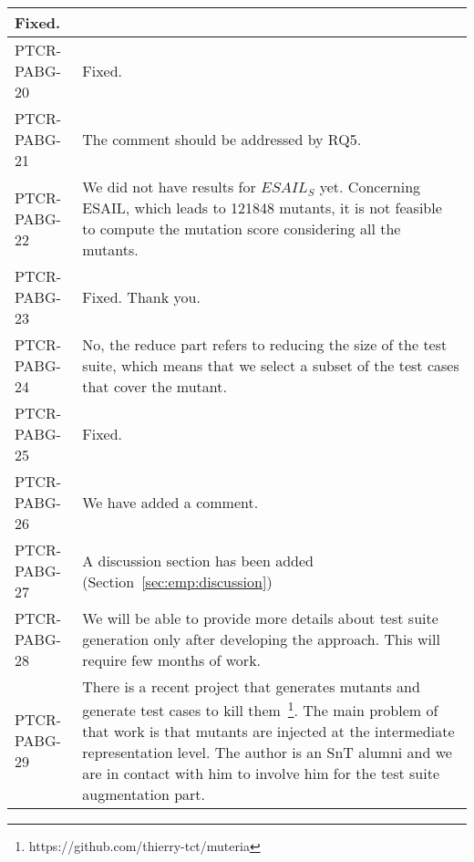 \begin{longtable}{|p{1.5cm}|p{12cm}|@{}}
\begin{minipage}{12cm}
Fixed.
\end{minipage}\\
\hline
PTCR-PABG-20&
\begin{minipage}{12cm}
Fixed.
\end{minipage}\\
\hline
PTCR-PABG-21&
\begin{minipage}{12cm}
The comment should be addressed by RQ5.
\end{minipage}\\
\hline
PTCR-PABG-22&
\begin{minipage}{12cm}
We did not have results for $ESAIL_S$ yet. Concerning ESAIL, which leads to 121848 mutants, it is not feasible to compute the mutation score considering all the mutants.
\end{minipage}\\
\hline
PTCR-PABG-23&
\begin{minipage}{12cm}
Fixed. Thank you.
\end{minipage}\\
\hline
PTCR-PABG-24&
\begin{minipage}{12cm}
No, the reduce part refers to reducing the size of the test suite, which means that we select a subset of the test cases that cover the mutant.
\end{minipage}\\
\hline
PTCR-PABG-25&
\begin{minipage}{12cm}
Fixed.
\end{minipage}\\
\hline
PTCR-PABG-26&
\begin{minipage}{12cm}
We have added a comment.
\end{minipage}\\
\hline
PTCR-PABG-27&
\begin{minipage}{12cm}
A discussion section has been added (Section~\ref{sec:emp:discussion}) 
\end{minipage}\\
\hline
PTCR-PABG-28&
\begin{minipage}{12cm}
We will be able to provide more details about test suite generation only after developing the approach. This will require few months of work.
\end{minipage}\\
\hline
PTCR-PABG-29&
\begin{minipage}{12cm}
There is a recent project that generates mutants and generate test cases to kill them~\footnote{https://github.com/thierry-tct/muteria}. The main problem of that work is that mutants are injected at the intermediate representation level. The author is an SnT alumni and we are in contact with him to involve him for the test suite augmentation part.

\end{minipage}
\end{longtable}
